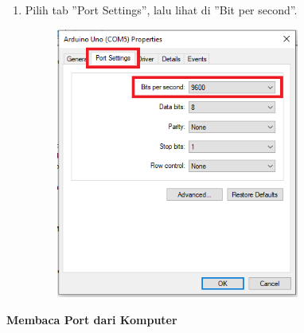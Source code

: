 \begin{enumerate}
	\item Pilih tab ''Port Settings'', lalu lihat di ''Bit per second''.
	\begin{figure}[H]
		\includegraphics[width=8cm]{figures/5/1174086/Teori/d4.png}
		\centering
	\end{figure}
\end{enumerate}


\hfill \break
\textbf{Membaca Port dari Komputer}


